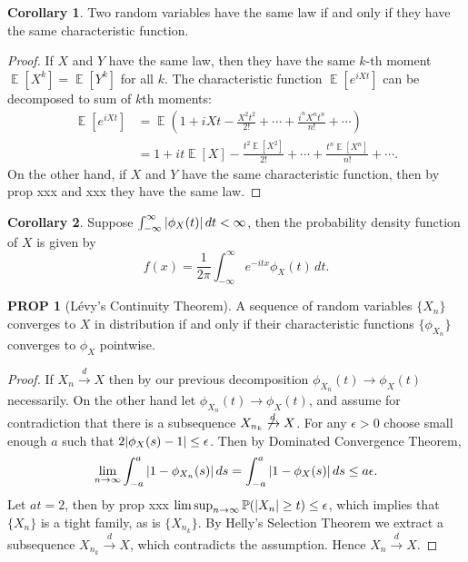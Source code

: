 \documentclass[hidelinks,11pt]{article}
\theoremstyle{definition}
\theoremstyle{dotles}
\theoremstyle{dotless}
\newtheorem{prop}{PROP}[section]
\newtheorem*{corollary}{Corollary}
\theoremstyle{remark}
\DeclareMathOperator{\E}{\mathbb{E}}
\begin{document}
\begin{corollary}
Two random variables have the same law if and only if they have the same characteristic function.
\end{corollary}
\begin{proof}
If $X$ and $Y$ have the same law, then they have the same $k$-th moment $\E[X^k]=\E[Y^k]$ for all $k$. The characteristic function $\E[e^{iXt}]$ can be decomposed to sum of $k$th moments:
\begin{align*}
\E[e^{iXt}]&=\E(1+iXt-\frac{X^2t^2}{2!}+\cdots+\frac{i^nX^nt^n}{n!}+\cdots)\\&=1+it\E[X]-\frac{t^2\E[X^2]}{2!}+\cdots+\frac{t^n\E[X^n]}{n!}+\cdots.
\end{align*}
On the other hand, if $X$ and $Y$ have the same characteristic function, then by prop xxx and xxx they have the same law.
\end{proof}

\begin{corollary}
Suppose $\int_{-\infty}^\infty\abs{\phi_X(t)}\,dt<\infty$, then the probability density function of $X$ is given by
\[f(x)=\frac{1}{2\pi}\int_{-\infty}^\infty e^{-itx}\phi_X(t)\,dt.\]
\end{corollary}

\begin{prop}[Lévy's Continuity Theorem]
A sequence of random variables $\{X_n\}$ converges to $X$ in distribution if and only if their characteristic functions $\{\phi_{X_n}\}$ converges to $\phi_X$ pointwise.
\end{prop}
\begin{proof}
If $X_n\xrightarrow{d}X$ then by our previous decomposition $\phi_{X_n}(t)\to\phi_X(t)$ necessarily.\smallbreak
On the other hand let $\phi_{X_n}(t)\to\phi_X(t)$, and assume for contradiction that there is a subsequence $X_{n_k}\not\xrightarrow{d}X$. For any $\epsilon>0$ choose small enough $a$ such that $2\abs{\phi_X(s)-1}\leq\epsilon$. Then by Dominated Convergence Theorem,
\[\lim_{n\to\infty}\int_{-a}^a\abs{1-\phi_{X_n}(s)}\,ds=\int_{-a}^a\abs{1-\phi_X(s)}\,ds\leq a\epsilon.\]
Let $at=2$, then by prop xxx $\limsup_{n\to\infty}\mathbb{P}(\abs{X_n}\geq t)\leq\epsilon$, which implies that $\{X_n\}$ is a tight family, as is $\{X_{n_k}\}$. By Helly's Selection Theorem we extract a subsequence $X_{n_k}\xrightarrow{d}X$, which contradicts the assumption. Hence $X_n\xrightarrow{d}X$.
\end{proof}
\end{document}
